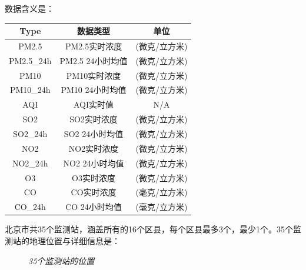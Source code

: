 ﻿\documentclass{article}
\begin{document}
\begin{CJK*}{GBK}{song}
数据含义是：
\begin{center}
\begin{tabular}{|c|c|c|} \hline
\textbf{Type} & \textbf{数据类型} & \textbf{单位} \\ \hline
PM2.5 & PM2.5实时浓度 & (微克/立方米) \\ \hline
PM2.5\_24h & PM2.5 24小时均值 & (微克/立方米) \\ \hline
PM10 & PM10实时浓度 & (微克/立方米) \\ \hline
PM10\_24h & PM10 24小时均值 & (微克/立方米) \\ \hline
AQI & AQI实时值 & N/A \\ \hline
SO2 & SO2实时浓度 & (微克/立方米) \\ \hline
SO2\_24h & SO2 24小时均值 & (微克/立方米) \\ \hline
NO2 & NO2实时浓度 & (微克/立方米) \\ \hline
NO2\_24h & NO2 24小时均值 & (微克/立方米) \\ \hline
O3 & O3实时浓度 & (微克/立方米) \\ \hline
CO & CO实时浓度 & (毫克/立方米) \\ \hline
CO\_24h & CO 24小时均值 & (毫克/立方米) \\ \hline
\end{tabular}
\end{center}

北京市共35个监测站，涵盖所有的16个区县，每个区县最多3个，最少1个。35个监测站的地理位置与详细信息是：

\begin{figure}[ht]
\centering
{}
\caption{\textit{35个监测站的位置}}
\end{figure}



\end{CJK*}
\end{document}
